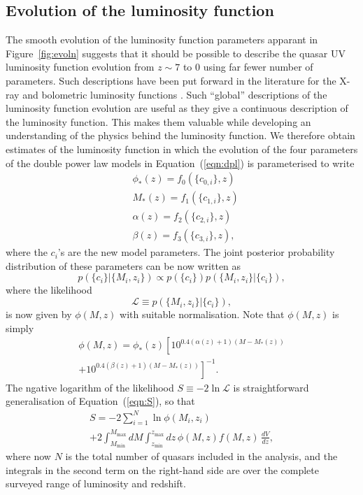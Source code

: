 \documentclass[a4paper,fleqn,usenatbib]{mnras}
\begin{document}

\subsection{Evolution of the luminosity function}

The smooth evolution of the luminosity function parameters apparant in
Figure~\ref{fig:evoln} suggests that it should be possible to describe
the quasar UV luminosity function evolution from $z\sim 7$ to $0$
using far fewer number of parameters.  Such descriptions have been put
forward in the literature for the X-ray and bolometric luminosity
functions \citep[e.g.,][]{2007ApJ...654..731H, 2015MNRAS.451.1892A}.
Such ``global'' descriptions of the luminosity function evolution are
useful as they give a continuous description of the luminosity
function.  This makes them valuable while developing an understanding
of the physics behind the luminosity function. We therefore obtain
estimates of the luminosity function in which the evolution of the
four parameters of the double power law models in
Equation~(\ref{eqn:dpl}) is parameterised to write
\begin{align}
  &\phi_*(z) = f_0(\{c_{0,i}\}, z)\nonumber\\
  &M_*(z) = f_1(\{c_{1,i}\}, z)\nonumber\\
  &\alpha(z) = f_2(\{c_{2,i}\}, z)\nonumber\\
  &\beta(z) = f_3(\{c_{3,i}\}, z),
\label{eqn:global}
\end{align}
where the $c_i$'s are the new model parameters.  The joint posterior
probability distribution of these parameters can be now written as
\begin{equation}
  p(\{c_i\} | \{M_i, z_i\}) \propto p(\{c_i\})p(\{M_i, z_i\} | \{c_i\}),
\end{equation}
where the likelihood 
\begin{equation}
  \mathcal{L}\equiv p(\{M_i, z_i\} | \{c_i\}),
\end{equation}
is now given by $\phi(M,z)$ with suitable normalisation.  Note that
$\phi(M,z)$ is simply 
\begin{multline}
  \phi(M,z) = \phi_*(z) \left[10^{0.4(\alpha(z)+1)(M-M_*(z))}\right. \\ \left.+ 10^{0.4(\beta(z)+1)(M-M_*(z))}\right]^{-1}.
\end{multline}
The ngative logarithm of the likelihood $S\equiv -2\ln\mathcal{L}$ is
straightforward generalisation of Equation~(\ref{eqn:S}), so that
\begin{multline}
  S = -2\sum_{i=1}^N\ln\phi(M_i, z_i)\\+2\int_{M_\mathrm{min}}^{M_\mathrm{max}}dM\int_{z_\mathrm{min}}^{z_\mathrm{max}}dz\, \phi(M,z) f(M, z)\,\frac{dV}{dz},
  \label{eqn:S2}
\end{multline}
where now $N$ is the total number of quasars included in the analysis,
and the integrals in the second term on the right-hand side are over
the complete surveyed range of luminosity and redshift.
\end{document}
